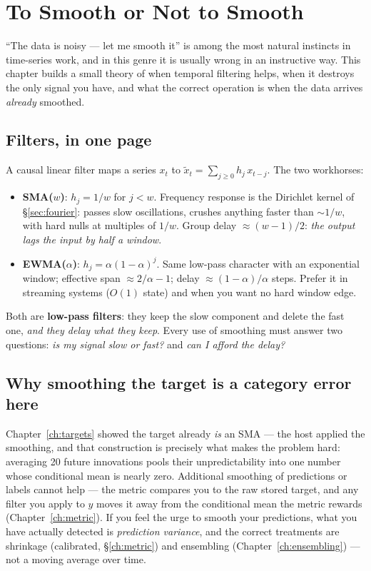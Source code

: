 \chapter{To Smooth or Not to Smooth}
\label{ch:smoothing}

``The data is noisy --- let me smooth it'' is among the most natural
instincts in time-series work, and in this genre it is usually wrong in an
instructive way. This chapter builds a small theory of when temporal
filtering helps, when it destroys the only signal you have, and what the
correct operation is when the data arrives \emph{already} smoothed.

\section{Filters, in one page}

A causal linear filter maps a series $x_t$ to
$\tilde x_t = \sum_{j \ge 0} h_j\, x_{t-j}$. The two workhorses:

\begin{itemize}
\item \textbf{SMA($w$)}: $h_j = 1/w$ for $j < w$. Frequency response is the
  Dirichlet kernel of \S\ref{sec:fourier}: passes slow oscillations,
  crushes anything faster than $\sim 1/w$, with hard nulls at multiples of
  $1/w$. Group delay $\approx (w{-}1)/2$: \emph{the output lags the input
  by half a window}.
\item \textbf{EWMA($\alpha$)}: $h_j = \alpha(1-\alpha)^j$. Same low-pass
  character with an exponential window; effective span
  $\approx 2/\alpha - 1$; delay $\approx (1-\alpha)/\alpha$ steps. Prefer
  it in streaming systems ($O(1)$ state) and when you want no hard window
  edge.
\end{itemize}

Both are \textbf{low-pass filters}: they keep the slow component and delete
the fast one, \emph{and they delay what they keep}. Every use of smoothing
must answer two questions: \emph{is my signal slow or fast?} and \emph{can I
afford the delay?}

\section{Why smoothing the target is a category error here}

Chapter~\ref{ch:targets} showed the target already \emph{is} an SMA ---
the host applied the smoothing, and that construction is precisely what
makes the problem hard: averaging 20 future innovations pools their
unpredictability into one number whose conditional mean is nearly zero.
Additional smoothing of predictions or labels cannot help --- the metric
compares you to the raw stored target, and any filter you apply to
$\hat y$ moves it away from the conditional mean the metric rewards
(Chapter~\ref{ch:metric}). If you feel the urge to smooth your predictions,
what you have actually detected is \emph{prediction variance}, and the
correct treatments are shrinkage (calibrated, \S\ref{ch:metric}) and
ensembling (Chapter~\ref{ch:ensembling}) --- not a moving average over time.

